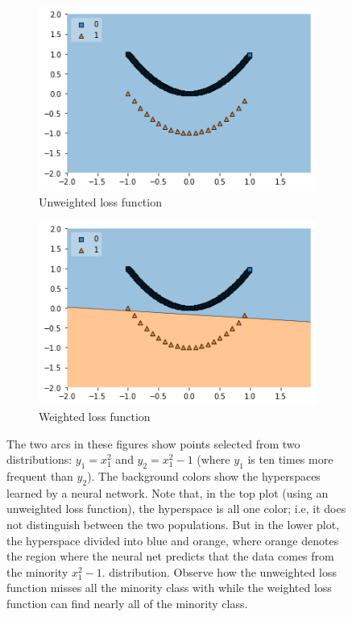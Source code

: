 \documentclass[10pt,compsoc,twocolumn]{IEEEtran}
\begin{document}
\begin{figure}[!h]
\centering
    \begin{subfigure}[b]{.4\textwidth}
        \centering
        \includegraphics[width=.7\textwidth]{unweighted.png}
        \caption{Unweighted loss function}
        \label{fig:unweighted}
    \end{subfigure}
    \begin{subfigure}[b]{.4\textwidth}
        \centering
        \includegraphics[width=.7\textwidth]{weighted.png}
        \caption{Weighted loss function}
        \label{fig:weighted}
    \end{subfigure}
    \caption{The two arcs in these figures show points selected from two distributions: $y_1=x_1^2$ and $y_2=x_1^2-1$ (where $y_1$ is ten times more frequent than $y_2$).  The background colors show the hyperspaces learned by a neural network. Note that, in the top plot (using an unweighted loss function), the hyperspace is all one color; i.e, it does not distinguish between the two populations. But in the lower plot, the hyperspace divided into blue and orange, where orange denotes the region where the neural net predicts that the data comes from the minority  $x_1^2-1$. distribution. Observe how  the unweighted loss function misses all the minority class with  while the  weighted loss function can find nearly all  of the minority class.}
\end{figure}
\end{document}
